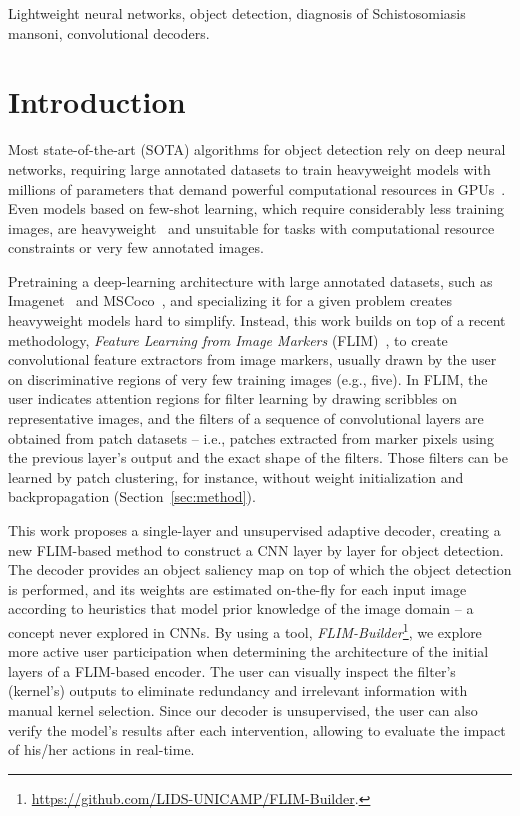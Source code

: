 \documentclass[10pt,twocolumn,twoside]{IEEEtran}
\begin{document}
\begin{IEEEkeywords}
Lightweight neural networks, object detection, diagnosis of  Schistosomiasis mansoni, convolutional decoders. 
\end{IEEEkeywords}

\section{Introduction}\label{sec:intro}
Most state-of-the-art (SOTA) algorithms for object detection rely on deep neural networks, requiring large annotated datasets to train heavyweight models with millions of parameters that demand powerful computational resources in GPUs~\cite{zaidi2022survey}. Even models based on few-shot learning, which require considerably less training images, are heavyweight~\cite{huang2021survey} and unsuitable for tasks with computational resource constraints or very few annotated images.

Pretraining a deep-learning architecture with large annotated datasets, such as Imagenet~\cite{deng2009imagenet} and MSCoco~\cite{lin2014microsoft}, and specializing it for a given problem creates heavyweight models hard to simplify. Instead, this work builds on top of a recent methodology, \textit{Feature Learning from Image Markers} (FLIM)~\cite{de2020feature}, to create convolutional feature extractors from image markers, usually drawn by the user on discriminative regions of very few training images (e.g., five). In FLIM, the user indicates attention regions for filter learning by drawing scribbles on representative images, and the filters of a sequence of convolutional layers are obtained from patch datasets -- i.e., patches extracted from marker pixels using the previous layer's output and the exact shape of the filters. Those filters can be learned by patch clustering, for instance, without weight initialization and backpropagation (Section~\ref{sec:method}). 

This work proposes a single-layer and unsupervised adaptive decoder, creating a new FLIM-based method to construct a CNN layer by layer for object detection. The decoder provides an object saliency map on top of which the object detection is performed, and its weights are estimated on-the-fly for each input image according to heuristics that model prior knowledge of the image domain -- a concept never explored in CNNs. By using a tool, \textit{FLIM-Builder}\footnote{\url{https://github.com/LIDS-UNICAMP/FLIM-Builder}.}, we explore more active user participation when determining the architecture of the initial layers of a FLIM-based encoder. The user can visually inspect the filter's (kernel's) outputs to eliminate redundancy and irrelevant information with manual kernel selection. Since our decoder is unsupervised, the user can also verify the model's results after each intervention, allowing to evaluate the impact of his/her actions in real-time.
\end{document}
